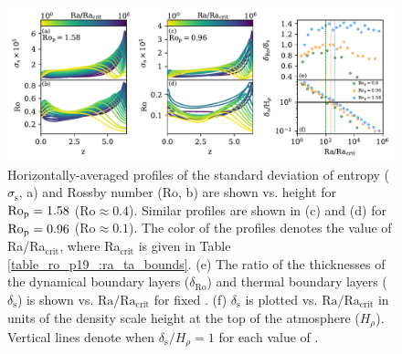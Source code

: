\begin{figure}[ht!]
    \includegraphics[width=\textwidth]{./figs/boundary_layers.pdf}
    \caption[Boundary layer evolution on fixed Predictive Rossby paths]
	{Horizontally-averaged profiles of the standard deviation of entropy ($\sigma_{\text{s}}$, a) and Rossby number (Ro, b) 
    are shown vs. height for $\text{Ro}_{\text{p}} = 1.58$ ($\text{Ro} \approx 0.4$). 
    Similar profiles are shown in (c) and (d) for $\text{Ro}_{\text{p}} = 0.96$ ($\text{Ro} \approx 0.1$). The color of the profiles
    denotes the value of Ra/Ra$_{\text{crit}}$, where Ra$_\text{crit}$ is given in Table \ref{table_ro_p19_:ra_ta_bounds}.
    (e) The ratio of the thicknesses of the dynamical boundary layers ($\delta_{\text{Ro}}$) and 
    thermal boundary layers ($\delta_{\text{s}}$) is shown vs. $\text{Ra}/\text{Ra}_{\text{crit}}$ for fixed \pro.
	(f) $\delta_{\text{s}}$ is plotted vs. $\text{Ra}/\text{Ra}_{\text{crit}}$ in units of the density
	scale height at the top of the atmosphere ($H_\rho$). Vertical lines denote when $\delta_\text{s}/H_\rho = 1$
	for each value of \pro.
    \label{fig:profiles_and_bls} }
\end{figure}



